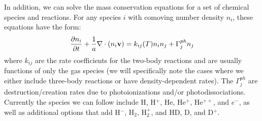 In addition, we can solve the mass conservation equations for a set of chemical species and reactions.  For any species $i$ with comoving number density $n_i$, these equations have the form:
\begin{equation}
\frac{\partial n_i}{\partial t} 
          + \frac{1}{a} \nabla \cdot (n_i \vecv) = 
        k_{ij}(T) n_i n_j 
      + \Gamma^{ph}_j n_j 
        \label{eq:species_evolution}
\end{equation}
where $k_{ij}$ are the rate coefficients for the two-body reactions
and are usually functions of only the gas species (we will
specifically note the cases where we either include three-body
reactions or have density-dependent rates).  The $\Gamma^{ph}_j$ are
destruction/creation rates due to photoionizations and/or
photodissociations.  Currently the species we can follow include H,
H$^+$, He, He$^+$, He$^{++}$, and $e^-$, as well as additional options
that add H$^-$, H$_2$, H$_2^+$, and  HD, D, and D$^+$.



%



